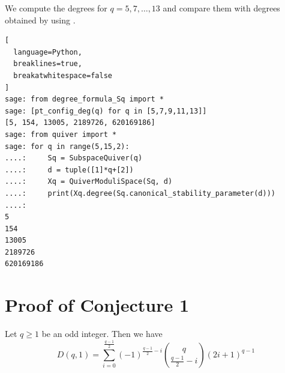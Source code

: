\documentclass[11pt]{article}
\begin{document}
We compute the degrees for \(q = 5, 7, \dots, 13\) and compare them with degrees obtained by using \cite{quivertools}. 

\begin{lstlisting}[
  language=Python,
  breaklines=true,
  breakatwhitespace=false
]
sage: from degree_formula_Sq import *
sage: [pt_config_deg(q) for q in [5,7,9,11,13]]
[5, 154, 13005, 2189726, 620169186]
sage: from quiver import *
sage: for q in range(5,15,2):
....:     Sq = SubspaceQuiver(q)
....:     d = tuple([1]*q+[2])
....:     Xq = QuiverModuliSpace(Sq, d)
....:     print(Xq.degree(Sq.canonical_stability_parameter(d)))
....: 
5
154
13005
2189726
620169186
\end{lstlisting}

\section{Proof of Conjecture 1}\label{appendix:C}

\begin{proposition}
    \label{Proposition:macmahon-conj}
    Let \(q\geq 1\) be an odd integer. Then we have
    \[
    D(q, 1) = \sum_{i = 0}^{\frac{q-1}{2}}(-1)^{\frac{q-1}{2}-i}\binom{q}{\frac{q-1}{2}-i}(2i+1)^{q-1}
    \]
\end{proposition}
\end{document}
